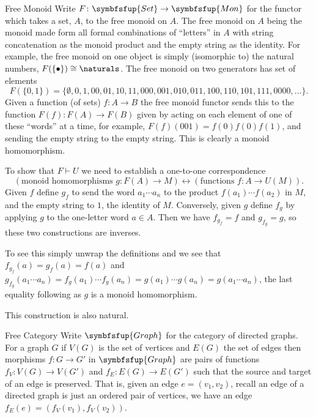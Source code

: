 \documentclass[fleqn]{NotesClass}
\makeatletter
\newcommand{\c@egory}[1]{\symbfsfup{#1}}
\newcommand{\Set}{\c@egory{Set}}
\newcommand{\Mon}{\c@egory{Mon}}
\newcommand{\Graph}{\c@egory{Graph}}
\newcommand{\isomorphic}{\cong}
\newcommand{\leftadjoint}{\vdash}
\makeatother
\begin{document}
\begin{appendices}
\begin{exm}{Free Monoid}{}
            Write \(F \colon \Set \to \Mon\) for the functor which takes a set, \(A\), to the free monoid on \(A\).
            The free monoid on \(A\) being the monoid made form all formal combinations of \enquote{letters} in \(A\) with string concatenation as the monoid product and the empty string as the identity.
            For example, the free monoid on one object is simply (isomorphic to) the natural numbers, \(F(\{\bullet\}) \isomorphic \naturals\).
            The free monoid on two generators has set of elements
            \begin{equation}
                F(\{0, 1\}) = \{\emptyset, 0, 1, 00, 01, 10, 11, 000, 001, 010, 011, 100, 110, 101, 111, 0000, \dotsc\}.
            \end{equation}
            Given a function (of sets) \(f \colon A \to B\) the free monoid functor sends this to the function \(F(f)\colon F(A) \to F(B)\) given by acting on each element of one of these \enquote{words} at a time, for example, \(F(f)(001) = f(0)f(0)f(1)\), and sending the empty string to the empty string.
            This is clearly a monoid homomorphism.
            
            To show that \(F \leftadjoint U\) we need to establish a one-to-one correspondence
            \begin{equation}
                (\text{monoid homomorphisms } g\colon F(A) \to M) \leftrightarrow (\text{functions } f \colon A \to U(M)).
            \end{equation}
            Given \(f\) define \(g_f\) to send the word \(a_1 \dotsm a_n\) to the product \(f(a_1)\dotsm f(a_2)\) in \(M\), and the empty string to \(1\), the identity of \(M\).
            Conversely, given \(g\) define \(f_g\) by applying \(g\) to the one-letter word \(a \in A\).
            Then we have \(f_{g_f} = f\) and \(g_{f_g} = g\), so these two constructions are inverses.
            
            To see this simply unwrap the definitions and we see that \(f_{g_f}(a) = g_f(a) = f(a)\) and \(g_{f_g}(a_1 \dotsm a_n) = f_g(a_1)\dotsm f_g(a_n) = g(a_1)\dotsm g(a_n) = g(a_1 \dotsm a_n)\), the last equality following as \(g\) is a monoid homomorphism.
            
            This construction is also natural.
        \end{exm}
        
        \begin{exm}{Free Category}{}
            Write \(\Graph\) for the category of directed graphs.
            For a graph \(G\) if \(V(G)\) is the set of vertices and \(E(G)\) the set of edges then morphisms \(f\colon G \to G'\) in \(\Graph\) are pairs of functions \(f_V \colon V(G) \to V(G')\) and \(f_E \colon E(G) \to E(G')\) such that the source and target of an edge is preserved.
            That is, given an edge \(e = (v_1, v_2)\), recall an edge of a directed graph is just an ordered pair of vertices, we have an edge \(f_E(e) = (f_V(v_1), f_V(v_2))\).
            

\end{exm}
\end{appendices}
\end{document}
